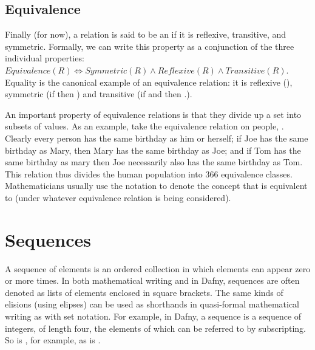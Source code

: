 \documentclass[letterpaper,10pt,english]{sphinxmanual}
\begin{document}
\subsection{Equivalence}
\label{\detokenize{07-set-theory:equivalence}}
Finally (for now), a relation is said to be an 
if it is reflexive, transitive, and symmetric. Formally, we can write
this property as a conjunction of the three individual properties:
\(Equivalence(R) \iff Symmetric(R) \land Reflexive(R) \land
Transitive(R)\). Equality is the canonical example of an equivalence
relation: it is reflexive (), symmetric (if  then ) and transitive (if  and  then .).

An important property of equivalence relations is that they divide up
a set into subsets of  values. As an example, take the
equivalence relation on people, . Clearly every
person has the same birthday as him or herself; if Joe has the same
birthday as Mary, then Mary has the same birthday as Joe; and if Tom
has the same birthday as mary then Joe necessarily also has the same
birthday as Tom. This relation thus divides the human population into
366 equivalence classes. Mathematicians usually use the notation  to denote the concept that  is equivalent to  (under whatever
equivalence relation is being considered).


\section{Sequences}
\label{\detokenize{07-set-theory:sequences}}
A sequence of elements is an ordered collection in which elements can
appear zero or more times. In both mathematical writing and in Dafny,
sequences are often denoted as lists of elements enclosed in square
brackets.  The same kinds of elisions (using elipses) can be used as
shorthands in quasi-formal mathematical writing as with set notation.
For example, in Dafny, a sequence  is a sequence of
integers, of length four, the elements of which can be referred to by
subscripting. So  is , for example, as is .
\end{document}
